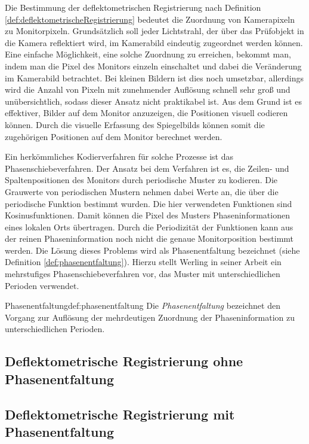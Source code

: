 Die Bestimmung der deflektometrischen Registrierung nach Definition \ref{def:deflektometrischeRegistrierung} bedeutet die Zuordnung von Kamerapixeln zu Monitorpixeln.
Grundsätzlich soll jeder Lichtstrahl, der über das Prüfobjekt in die Kamera reflektiert wird, im Kamerabild eindeutig zugeordnet werden können.
Eine einfache Möglichkeit, eine solche Zuordnung zu erreichen, bekommt man, indem man die Pixel des Monitors einzeln einschaltet und dabei die Veränderung im Kamerabild betrachtet.
Bei kleinen Bildern ist dies noch umsetzbar, allerdings wird die Anzahl von Pixeln mit zunehmender Auflösung schnell sehr groß und unübersichtlich, sodass dieser Ansatz nicht praktikabel ist.
Aus dem Grund ist es effektiver, Bilder auf dem Monitor anzuzeigen, die Positionen visuell codieren können.
Durch die visuelle Erfassung des Spiegelbilds können somit die zugehörigen Positionen auf dem Monitor berechnet werden.

\p
Ein herkömmliches Kodierverfahren für solche Prozesse ist das Phasenschiebeverfahren.
Der Ansatz bei dem Verfahren ist es, die Zeilen- und Spaltenpositionen des Monitors durch periodische Muster zu kodieren.
Die Grauwerte von periodischen Mustern nehmen dabei Werte an, die über die periodische Funktion bestimmt wurden.
Die hier verwendeten Funktionen sind Kosinusfunktionen.
Damit können die Pixel des Musters Phaseninformationen eines lokalen Orts übertragen.
Durch die Periodizität der Funktionen kann aus der reinen Phaseninformation noch nicht die genaue Monitorposition bestimmt werden.
Die Lösung dieses Problems wird als Phasenentfaltung bezeichnet (siehe Definition \ref{def:phasenentfaltung}).
Hierzu stellt Werling in seiner Arbeit \cite{kit_werling} ein mehrstufiges Phasenschiebeverfahren vor, das Muster mit unterschiedlichen Perioden verwendet.

\begin{Definition}{Phasenentfaltung}{def:phasenentfaltung}
	Die \textit{Phasenentfaltung} bezeichnet den Vorgang zur Auflösung der mehrdeutigen Zuordnung der Phaseninformation zu unterschiedlichen Perioden.
\end{Definition}

{
	\FloatBarrier
    \subsection{Deflektometrische Registrierung ohne Phasenentfaltung}
    \label{sub:registrierungOhnePhasenentfaltung}
    
}

{
	\FloatBarrier
    \subsection{Deflektometrische Registrierung mit Phasenentfaltung}
    \label{sub:registrierungMitPhasenentfaltung}
    
}